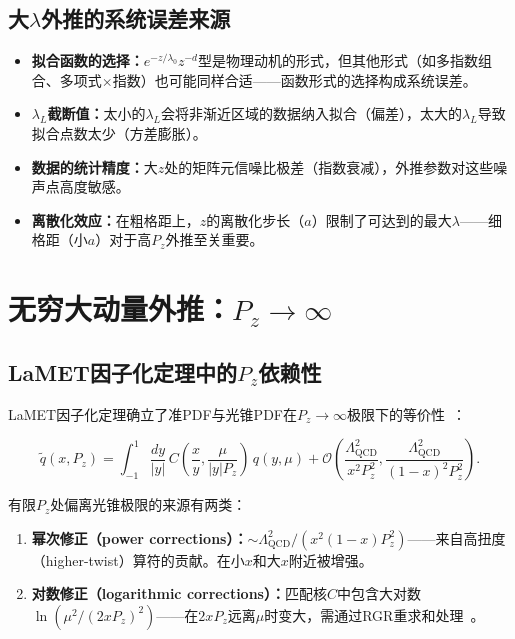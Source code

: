 \documentclass[12pt,a4paper]{ctexart}
\theoremstyle{definition}
\begin{document}
\subsection{大$\lambda$外推的系统误差来源}

\begin{itemize}[nosep]
    \item \textbf{拟合函数的选择：}$e^{-z/\lambda_0} z^{-d}$型是物理动机的形式，但其他形式（如多指数组合、多项式$\times$指数）也可能同样合适——函数形式的选择构成系统误差。
    \item \textbf{$\lambda_L$截断值：}太小的$\lambda_L$会将非渐近区域的数据纳入拟合（偏差），太大的$\lambda_L$导致拟合点数太少（方差膨胀）。
    \item \textbf{数据的统计精度：}大$z$处的矩阵元信噪比极差（指数衰减），外推参数对这些噪声点高度敏感。
    \item \textbf{离散化效应：}在粗格距上，$z$的离散化步长（$a$）限制了可达到的最大$\lambda$——细格距（小$a$）对于高$P_z$外推至关重要。
\end{itemize}

\section{无穷大动量外推：$P_z \to \infty$}

\subsection{LaMET因子化定理中的$P_z$依赖性}

LaMET因子化定理确立了准PDF与光锥PDF在$P_z \to \infty$极限下的等价性~\cite{Ji2013Euclidean,Izubuchi2018}：

\begin{equation}
\tilde q(x, P_z) = \int_{-1}^1 \frac{dy}{|y|}\, C\!\left(\frac{x}{y}, \frac{\mu}{|y|P_z}\right)\, q(y, \mu) + \mathcal{O}\!\left(\frac{\Lambda_{\text{QCD}}^2}{x^2 P_z^2}, \frac{\Lambda_{\text{QCD}}^2}{(1-x)^2 P_z^2}\right).
\label{eq:factorization_Pz}
\end{equation}

有限$P_z$处偏离光锥极限的来源有两类：

\begin{enumerate}[leftmargin=*]
    \item \textbf{幂次修正（power corrections）：}$\sim \Lambda_{\text{QCD}}^2/(x^2(1-x)P_z^2)$——来自高扭度（higher-twist）算符的贡献。在小$x$和大$x$附近被增强。
    \item \textbf{对数修正（logarithmic corrections）：}匹配核$C$中包含大对数$\ln(\mu^2/(2xP_z)^2)$——在$2xP_z$远离$\mu$时变大，需通过RGR重求和处理~\cite{Su2023RGR}。
\end{enumerate}
\end{document}
